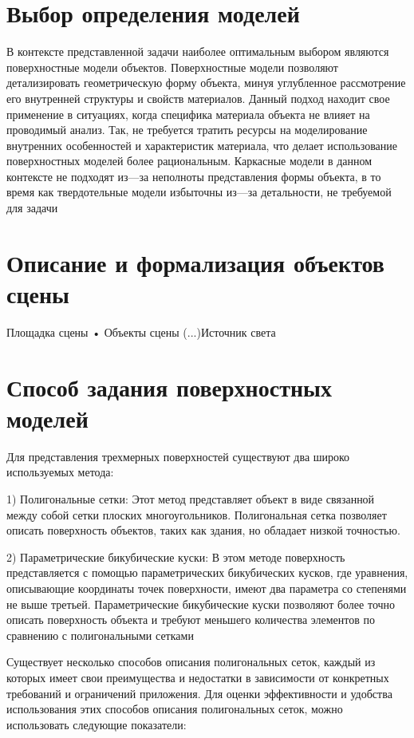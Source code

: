 \section*{Выбор определения моделей} %
В контексте представленной задачи наиболее оптимальным выбором являются поверхностные модели объектов. Поверхностные модели позволяют детализировать геометрическую форму объекта, минуя углубленное рассмотрение его внутренней структуры и свойств материалов. Данный подход находит свое применение в ситуациях, когда специфика материала объекта не влияет на проводимый анализ. Так, не требуется тратить ресурсы на моделирование внутренних особенностей и характеристик материала, что делает использование поверхностных моделей более рациональным. Каркасные модели в данном контексте не подходят из---за неполноты представления формы объекта, в то время как твердотельные модели избыточны из---за детальности, не требуемой для задачи

\section{ Описание и  формализация  объектов сцены} %

Площадка сцены   • Объекты сцены (...)Источник света 




\section{Способ задания поверхностных моделей}

Для представления трехмерных поверхностей существуют два широко используемых метода:

    1) Полигональные сетки: Этот метод представляет объект в виде связанной между собой сетки плоских многоугольников. Полигональная сетка позволяет описать поверхность объектов, таких как здания, но обладает низкой точностью.

    2) Параметрические бикубические куски: В этом методе поверхность представляется с помощью параметрических бикубических кусков, где уравнения, описывающие координаты точек поверхности, имеют два параметра со степенями не выше третьей. Параметрические бикубические куски позволяют более точно описать поверхность объекта и требуют меньшего количества элементов по сравнению с полигональными сетками

Существует несколько способов описания полигональных сеток, каждый из которых имеет свои преимущества и недостатки в зависимости от конкретных требований и ограничений приложения. Для оценки эффективности и удобства использования этих способов описания полигональных сеток, можно использовать следующие показатели:

